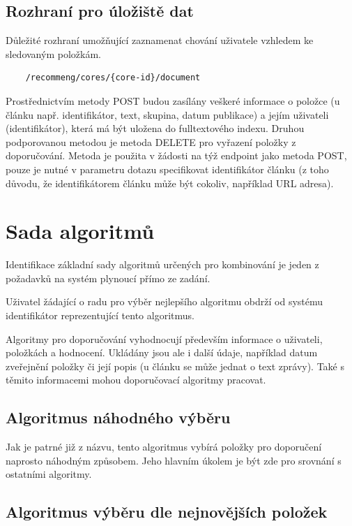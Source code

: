 \documentclass[thesis=M,czech]{FITthesis}[2014/05/07]
\begin{document}
\subsection{Rozhraní pro úložiště dat}

Důležité rozhraní umožňující zaznamenat chování uživatele vzhledem ke sledovaným položkám.

\begin{verbatim}
	/recommeng/cores/{core-id}/document
\end{verbatim}

Prostřednictvím metody POST budou zasílány veškeré informace o položce (u článku např. identifikátor, text, skupina, datum publikace) a jejím uživateli (identifikátor), která má být uložena do fulltextového indexu. Druhou podporovanou metodou je metoda DELETE pro vyřazení položky z doporučování. Metoda je použita v žádosti na týž endpoint jako metoda POST, pouze je nutné v parametru dotazu specifikovat identifikátor článku (z toho důvodu, že identifikátorem článku může být cokoliv, například URL adresa).
			
\section{Sada algoritmů}

Identifikace základní sady algoritmů určených pro kombinování je jeden z požadavků na systém plynoucí přímo ze zadání. 

Uživatel žádající o radu pro výběr nejlepšího algoritmu obdrží od systému identifikátor reprezentující tento algoritmus. 

Algoritmy pro doporučování vyhodnocují především informace o uživateli, položkách a hodnocení. Ukládány jsou ale i další údaje, například datum zveřejnění položky či její popis (u článku se může jednat o text zprávy). Také s těmito informacemi mohou doporučovací algoritmy pracovat. 

\subsection{Algoritmus náhodného výběru}

Jak je patrné již z názvu, tento algoritmus vybírá položky pro doporučení naprosto náhodným způsobem. Jeho hlavním úkolem je být zde pro srovnání s ostatními algoritmy. 

\subsection{Algoritmus výběru dle nejnovějších položek}
\end{document}
